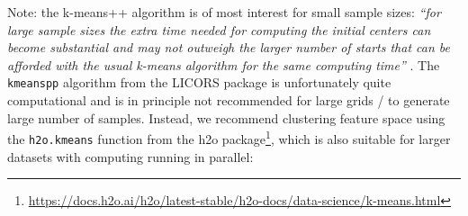\documentclass[
  graybox,natbib,nospthms]{svmono}
\newenvironment{Shaded}{\begin{snugshade}}{\end{snugshade}}
\newcommand{\AttributeTok}[1]{\textcolor[rgb]{0.61,0.61,0.61}{#1}}
\newcommand{\DecValTok}[1]{\textcolor[rgb]{0.06,0.06,0.06}{#1}}
\newcommand{\FunctionTok}[1]{\textcolor[rgb]{0,0,0}{#1}}
\newcommand{\NormalTok}[1]{#1}
\newcommand{\OtherTok}[1]{\textcolor[rgb]{0.37,0.37,0.37}{#1}}
\newcommand{\SpecialCharTok}[1]{\textcolor[rgb]{0,0,0}{#1}}
\renewcommand{\href}[2]{#2 (\url{#1})}
\renewcommand{\href}[2]{#2\footnote{\url{#1}}}
\begin{document}
\begin{Shaded}
\end{Shaded}

Note: the k-means++ algorithm is of most interest for small sample sizes: \emph{``for large
sample sizes the extra time needed for computing the initial centers can become
substantial and may not outweigh the larger number of starts that can be afforded
with the usual k-means algorithm for the same computing time''} \citep{Brus2021sampling}.
The \texttt{kmeanspp} algorithm from the LICORS package is unfortunately quite computational
and is in principle not recommended for large grids / to generate large number of
samples. Instead, we recommend clustering feature space using the \texttt{h2o.kmeans} function
from the \href{https://docs.h2o.ai/h2o/latest-stable/h2o-docs/data-science/k-means.html}{h2o
package},
which is also suitable for larger datasets with computing running in parallel:
\end{document}
